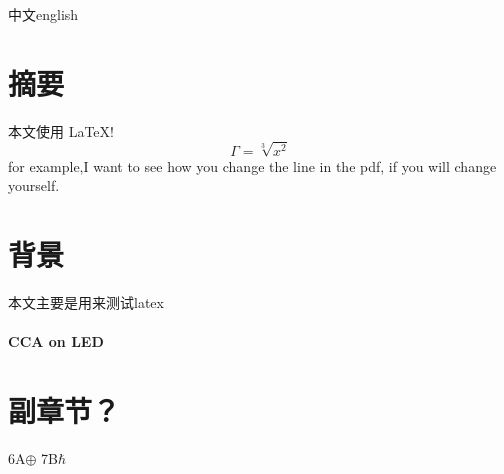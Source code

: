 \documentclass{article}
\begin{document}
	中文english
	\section{摘要}
	本文使用 \LaTeX!  $$ \Gamma=\sqrt[3]{x^2} $$
	for example,I want to see how you change the line in the pdf, if you will change yourself.
	\section{背景}
	本文主要是用来测试latex
	\paragraph{CCA on LED}\section*{副章节？}
	6A$\oplus$ 7B$\hbar$
\end{document}
